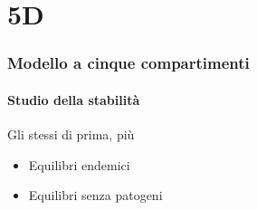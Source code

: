 \documentclass[]{beamer}
\begin{document}
\section{5D} %






\begin{frame}
    \frametitle{Modello a cinque compartimenti}
    \framesubtitle{Studio della stabilità}

    Gli stessi di prima, più
    \begin{itemize}
        \item Equilibri endemici
        \item Equilibri senza patogeni
    \end{itemize}
\end{frame}
\end{document}
